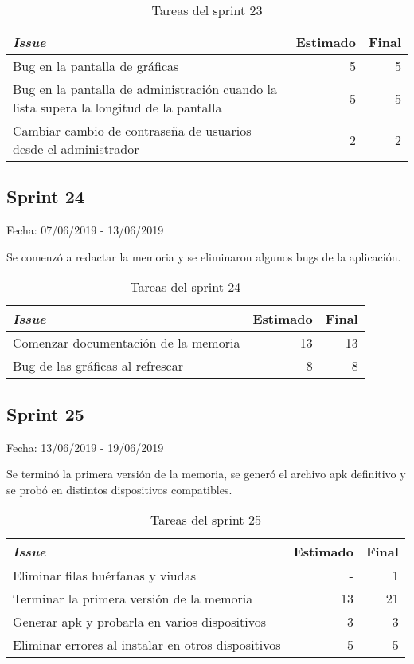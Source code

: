 \begin{table}[H]
	\begin{tabularx}{\textwidth}{Xrr}
		\toprule \textbf{\textit{Issue}} & \textbf{Estimado} & \textbf{Final}\\
		\toprule
		Bug en la pantalla de gráficas & 5 & 5 \\
		Bug en la pantalla de administración cuando la lista supera la longitud de la pantalla & 5 & 5 \\
		Cambiar cambio de contraseña de usuarios desde el administrador & 2 & 2 \\
		\bottomrule
	\end{tabularx}
	\caption{Tareas del sprint 23}
\end{table}

\subsection{Sprint 24}

Fecha: 07/06/2019 - 13/06/2019

Se comenzó a redactar la memoria y se eliminaron algunos bugs de la aplicación. 

\begin{table}[H]
	\begin{tabularx}{\textwidth}{Xrr}
		\toprule \textbf{\textit{Issue}} & \textbf{Estimado} & \textbf{Final}\\
		\toprule
		Comenzar documentación de la memoria & 13 & 13 \\
		Bug de las gráficas al refrescar & 8 & 8 \\
		\bottomrule
	\end{tabularx}
	\caption{Tareas del sprint 24}
\end{table}

\subsection{Sprint 25}

Fecha: 13/06/2019 - 19/06/2019

Se terminó la primera versión de la memoria, se generó el archivo apk definitivo y se probó en distintos dispositivos compatibles. 

\begin{table}[H]
	\begin{tabularx}{\textwidth}{Xrr}
		\toprule \textbf{\textit{Issue}} & \textbf{Estimado} & \textbf{Final}\\
		\toprule
		Eliminar filas huérfanas y viudas & - & 1 \\
		Terminar la primera versión de la memoria & 13 & 21 \\
		Generar apk y probarla en varios dispositivos & 3 & 3 \\
		Eliminar errores al instalar en otros dispositivos & 5 & 5 \\
		\bottomrule
	\end{tabularx}
	\caption{Tareas del sprint 25}
\end{table}

